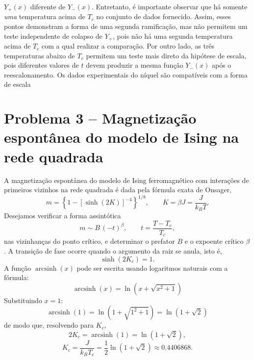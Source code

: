 \documentclass[11pt,a4paper]{article}
\begin{document}
$Y_+(x)$ diferente de $Y_-(x)$. Entretanto, é importante observar que há somente \emph{uma} temperatura acima de $T_c$ no conjunto de dados fornecido. Assim, esses pontos demonstram a forma de uma segunda ramificação, mas não permitem um teste independente de colapso de $Y_+$, pois não há uma segunda temperatura acima de $T_c$ com a qual realizar a comparação. Por outro lado, as três temperaturas abaixo de $T_c$ permitem um teste mais direto da hipótese de escala, pois diferentes valores de $t$
devem produzir a mesma função $Y_-(x)$ após o reescalonamento. Os dados experimentais do níquel são compatíveis com a forma de escala
\section*{Problema 3 -- Magnetização espontânea do modelo de Ising na rede quadrada}
A magnetização espontânea do modelo de Ising ferromagnético com interações de
primeiros vizinhos na rede quadrada é dada pela fórmula exata de Onsager,
%
\begin{equation}
    m = \left\{1 - \left[\sinh(2K)\right]^{-4}\right\}^{1/8},
    \qquad
    K = \beta J = \frac{J}{k_B T}.
    \label{eq:onsager_m}
\end{equation}
%
Desejamos verificar a forma assintótica
%
\begin{equation}
    m \sim B\,(-t)^{\beta},
    \qquad
    t = \frac{T-T_c}{T_c},
    \label{eq:assint_m}
\end{equation}
%
nas vizinhanças do ponto crítico, e determinar o prefator \(B\) e o expoente crítico \(\beta\). A transição de fase ocorre quando o argumento da raiz se anula, isto é,
%
\begin{equation}
    \sinh(2K_c) = 1.
    \label{eq:critical_condition}
\end{equation}
%
A função $\operatorname{arcsinh}(x)$ pode ser escrita usando logaritmos naturais com a fórmula:
%
\[
\operatorname{arcsinh}(x) = \ln \left(x + \sqrt{x^{2} + 1}\right)
\]
%
Substituindo $x = 1$:
%
\[
\operatorname{arcsinh}(1) = \ln \left(1 + \sqrt{1^{2} + 1}\right) = \ln (1 + \sqrt{2})
\]
%
de modo que, resolvendo para \(K_c\),
%
\begin{equation}
    2K_c = \operatorname{arcsinh}(1) = \ln(1+\sqrt{2}),
\end{equation}
%
\begin{equation}
    K_c = \frac{J}{k_B T_c}
    = \frac{1}{2}\ln(1+\sqrt{2})
    \approx 0.4406868.
    \label{eq:Kc}
\end{equation}
\end{document}

